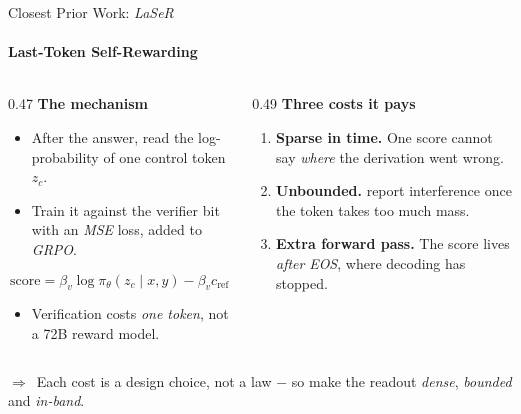 \documentclass[aspectratio=169,10pt,t]{beamer}
\DeclareRobustCommand{\acit}[1]{\textit{\acs{#1}}}
\newcommand{\takeaway}[1]{%
	\vfill
	\setlength{\fboxsep}{4pt}%
	\noindent\colorbox{jkulight}{%
		\begin{minipage}{\dimexpr\textwidth-2\fboxsep\relax}%
			\footnotesize\raggedright\color{jkunavy}%
			\textcolor{jkumagenta}{\textbf{$\Rightarrow$}}~#1%
		\end{minipage}}%
	\vspace{1pt}%
}
\newcommand{\lead}[1]{{\color{jkunavy}\textbf{#1}}\par\vspace{1pt}}
\newcommand{\hl}[1]{\textcolor{jkumagenta}{\textbf{#1}}}
\begin{document}
\begin{frame}{Closest Prior Work: \acit{LaSeR}}
	\framesubtitle{Last-Token Self-Rewarding~\citep{laser}}
	\begin{columns}[T, onlytextwidth]
		\begin{column}{0.47\textwidth}
			\lead{The mechanism}
			\begin{itemize}
				\setlength{\itemsep}{4pt}
				\item After the answer, read the log-probability of one control token $z_c$.
				\item Train it against the verifier bit with an \acit{MSE} loss, added to \acit{GRPO}.
			\end{itemize}
			\vspace{-0.15cm}
			\[
				\mathrm{score} = \beta_v \log \pi_\theta(z_c \mid x, y) - \beta_v c_{\mathrm{ref}}
			\]
			\vspace{-0.45cm}
			\begin{itemize}
				\item Verification costs \emph{one token}, not a 72B reward model.
			\end{itemize}
		\end{column}
		\begin{column}{0.49\textwidth}
			\lead{Three costs it pays}
			\begin{enumerate}
				\setlength{\itemsep}{5pt}
				\item \hl{Sparse in time.} One score cannot say \emph{where} the derivation went wrong.
				\item \hl{Unbounded.} \citet{laser} report interference once the token takes too much mass.
				\item \hl{Extra forward pass.} The score lives \emph{after} \acit{EOS}, where decoding has stopped.
			\end{enumerate}
		\end{column}
	\end{columns}
	\takeaway{Each cost is a design choice, not a law $-$ so make the readout \emph{dense}, \emph{bounded} and \emph{in-band}.}
\end{frame}
\end{document}
